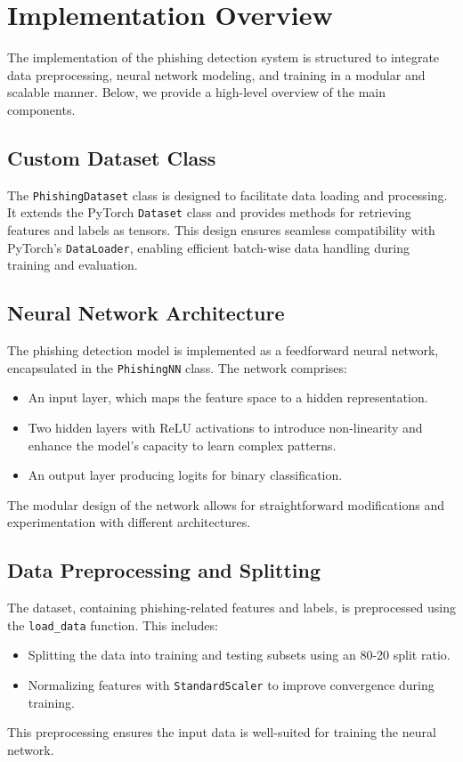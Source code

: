 \section{Implementation Overview}

The implementation of the phishing detection system is structured to integrate data preprocessing, neural network modeling, and training in a modular and scalable manner. Below, we provide a high-level overview of the main components.

\subsection{Custom Dataset Class}
The \texttt{PhishingDataset} class is designed to facilitate data loading and processing. It extends the PyTorch \texttt{Dataset} class and provides methods for retrieving features and labels as tensors. This design ensures seamless compatibility with PyTorch's \texttt{DataLoader}, enabling efficient batch-wise data handling during training and evaluation.

\subsection{Neural Network Architecture}
The phishing detection model is implemented as a feedforward neural network, encapsulated in the \texttt{PhishingNN} class. The network comprises:
\begin{itemize}
    \item An input layer, which maps the feature space to a hidden representation.
    \item Two hidden layers with ReLU activations to introduce non-linearity and enhance the model's capacity to learn complex patterns.
    \item An output layer producing logits for binary classification.
\end{itemize}
The modular design of the network allows for straightforward modifications and experimentation with different architectures.

\subsection{Data Preprocessing and Splitting}
The dataset, containing phishing-related features and labels, is preprocessed using the \texttt{load\_data} function. This includes:
\begin{itemize}
    \item Splitting the data into training and testing subsets using an 80-20 split ratio.
    \item Normalizing features with \texttt{StandardScaler} to improve convergence during training.
\end{itemize}
This preprocessing ensures the input data is well-suited for training the neural network.

